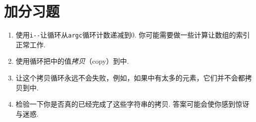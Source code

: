 \section{加分习题}

\begin{enumerate}
\item 使用\verb|i--|让循环从\verb|argc|循环计数递减到0. 你可能需要做一些计算让数组的索引正常工作.
\item 使用循环把中的值\emph{拷贝}（copy）到中.
\item 让这个拷贝循环永远不会失败，例如，如果中有太多的元素，它们并不会都拷贝到中.
\item 检验一下你是否真的已经完成了这些字符串的拷贝. 答案可能会使你感到惊讶与迷惑.
\end{enumerate}


